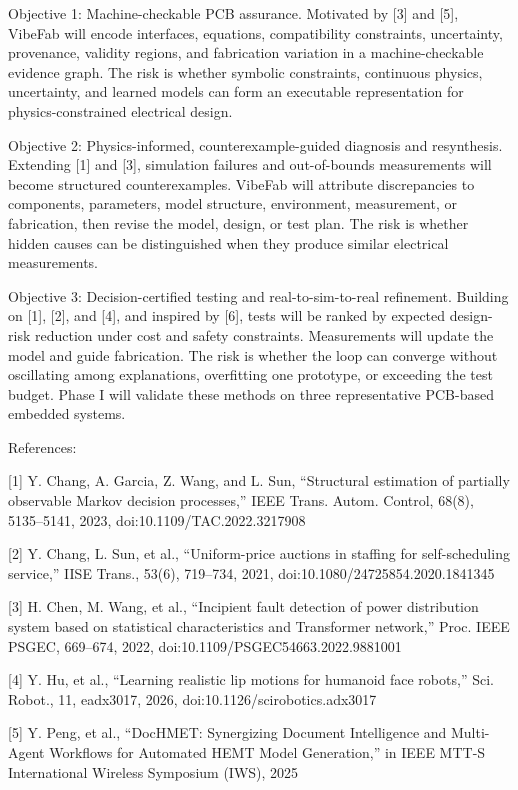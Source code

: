 \documentclass[12pt,letterpaper]{article}
\begin{document}
Objective 1: Machine-checkable PCB assurance. Motivated by [3] and [5], VibeFab will encode interfaces, equations, compatibility constraints, uncertainty, provenance, validity regions, and fabrication variation in a machine-checkable evidence graph. The risk is whether symbolic constraints, continuous physics, uncertainty, and learned models can form an executable representation for physics-constrained electrical design. 

Objective 2: Physics-informed, counterexample-guided diagnosis and resynthesis. Extending [1] and [3], simulation failures and out-of-bounds measurements will become structured counterexamples. VibeFab will attribute discrepancies to components, parameters, model structure, environment, measurement, or fabrication, then revise the model, design, or test plan. The risk is whether hidden causes can be distinguished when they produce similar electrical measurements. 

Objective 3: Decision-certified testing and real-to-sim-to-real refinement. Building on [1], [2], and [4], and inspired by [6], tests will be ranked by expected design-risk reduction under cost and safety constraints. Measurements will update the model and guide fabrication. The risk is whether the loop can converge without oscillating among explanations, overfitting one prototype, or exceeding the test budget. Phase I will validate these methods on three representative PCB-based embedded systems. 

References: 

[1] Y. Chang, A. Garcia, Z. Wang, and L. Sun, “Structural estimation of partially observable Markov decision processes,” IEEE Trans. Autom. Control, 68(8), 5135–5141, 2023, doi:10.1109/TAC.2022.3217908 

[2] Y. Chang, L. Sun, et al., “Uniform-price auctions in staffing for self-scheduling service,” IISE Trans., 53(6), 719–734, 2021, doi:10.1080/24725854.2020.1841345 

[3] H. Chen, M. Wang, et al., “Incipient fault detection of power distribution system based on statistical characteristics and Transformer network,” Proc. IEEE PSGEC, 669–674, 2022, doi:10.1109/PSGEC54663.2022.9881001 

[4] Y. Hu, et al., “Learning realistic lip motions for humanoid face robots,” Sci. Robot., 11, eadx3017, 2026, doi:10.1126/scirobotics.adx3017 

[5] Y. Peng, et al., “DocHMET: Synergizing Document Intelligence and Multi-Agent Workflows for Automated HEMT Model Generation,” in IEEE MTT-S International Wireless Symposium (IWS), 2025 
\end{document}
